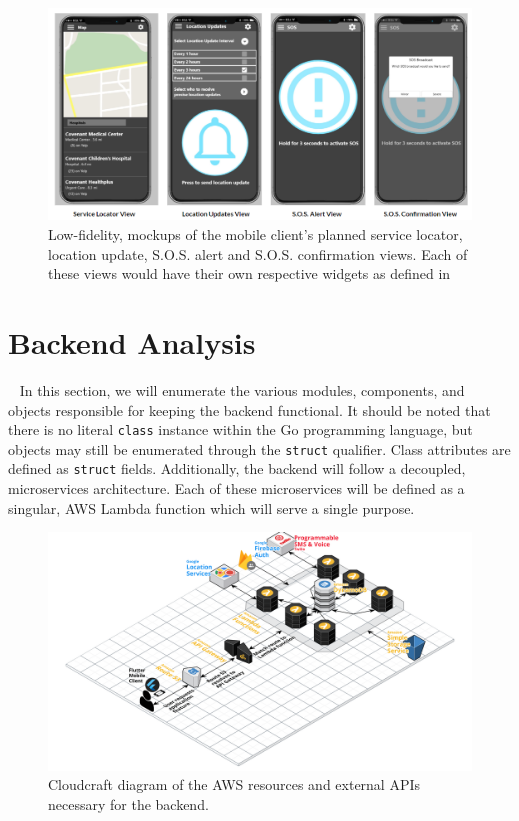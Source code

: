 \documentclass[10pt, a4paper]{article}
\begin{document}
\begin{figure}[H]
  \centerline{
  \includegraphics[scale=0.9]{mockups.png}
  }
  \caption{Low-fidelity, mockups of the mobile client's planned service locator, location update, S.O.S. alert and S.O.S. confirmation views. Each of these views would have their own respective widgets as defined in }
\end{figure}

\newpage

\section{Backend Analysis}
\par ~ In this section, we will enumerate the various modules, components, and objects responsible for keeping the backend functional. It should be noted that there is no literal \texttt{class} instance within the Go programming language, but objects may still be enumerated through the \texttt{struct} qualifier. Class attributes are defined as \texttt{struct} fields. Additionally, the backend will follow a decoupled, microservices architecture. Each of these microservices will be defined as a singular, AWS Lambda function which will serve a single purpose.

\begin{figure}[H]
\begin{center}
\centerline{
	\includegraphics[scale=.15]{EmergenSeek-Backend.PNG}
}
\caption{Cloudcraft \cite{one} diagram of the AWS resources and external APIs necessary for the backend.}
\end{center}	
\end{figure}
\end{document}
